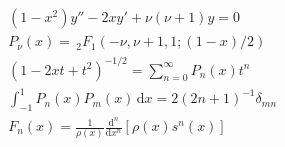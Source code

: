 \documentclass[a4paper,12pt, leqno, answers]{exam}
\begin{document}
\begin{align}
    & (1 - x^2) y'' - 2 x y' + \nu (\nu + 1) y = 0 \tag{EL} \label{eq:legendre} \\
    & P_\nu(x) = \,_2F_1(- \nu, \nu + 1, 1; (1 - x)/2) \tag{FL} \label{eq:legendre_funcao_pri_esp} \\
    & (1 - 2 x t + t^2)^{-1/2} = \sum_{n = 0}^\infty P_n(x) t^n \tag{FGL} \label{eq:legendre_funcao_geratriz} \\
    & \int_{-1}^1 P_n(x) P_m(x) \,\mathrm{d}x = 2 \left( 2n + 1 \right)^{-1} \delta_{mn} \label{eq:legendre_ortog} \\
    & F_{n}(x) = \frac{1}{\rho(x)} \frac{\mathrm{d}^n}{\mathrm{d} x^n}\left[ \rho(x) s^n(x) \right] \tag{FR} \label{eq:form_rodrigues}
\end{align}
\end{document}
